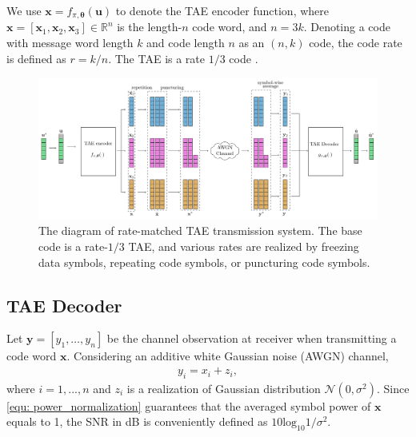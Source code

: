 \documentclass [PhD] {uclathes}
\begin{document}
We use $\mathbf{x}=f_{\pi,{\boldsymbol\theta}}(\mathbf{u})$ to denote the TAE encoder function, where $\mathbf{x}=[\mathbf{x}_1,\mathbf{x}_2,\mathbf{x}_3]\in\mathbb{R}^{n}$ is the length-$n$ code word, and $n=3k$. Denoting a code with message word length $k$ and code length $n$ as an $(n,k)$ code, the code rate is defined as $r=k/n$. The TAE is a rate $1/3$ code \cite{jiang2019turbo}.
\begin{figure}[t] 
    \centering
      \includegraphics[width=1\linewidth]{figures/structure.pdf}
      \caption{The diagram of rate-matched TAE transmission system. The base code is a rate-$1/3$ TAE, and various rates are realized by freezing data symbols, repeating code symbols, or puncturing code symbols.}
      \label{fig: rate_match_framework}
\end{figure}

\subsection{TAE Decoder}
Let $\mathbf{y}=[y_1,\ldots,y_n]$ be the channel observation at receiver when transmitting a code word $\mathbf{x}$. Considering an  additive white Gaussian noise (AWGN) channel,
\begin{align*}
    y_i=x_i+z_i,
\end{align*}
where $i=1,...,n$ and $z_i$ is a realization of Gaussian distribution $\mathcal{N}(0,\sigma^2)$. Since \eqref{equ: power_normalization} guarantees that the averaged symbol power of $\mathbf{x}$ equals to 1, the SNR in dB is conveniently defined as $10\mathrm{log}_{10} {1}/{\sigma^2}$.
\end{document}
